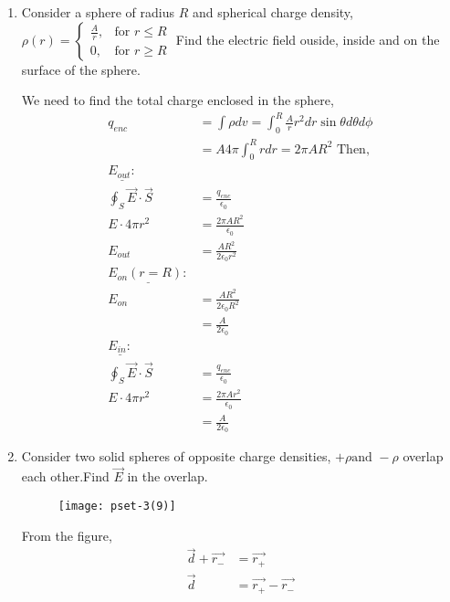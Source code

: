 \begin{enumerate}[label=\color{ocre}\textbf{\arabic*.}]
\begin{answer}
	
\end{answer}
\item Consider a sphere of radius $R$ and spherical charge density,$\rho(r)= 
\begin{cases}
\frac{A}{r},& \text{for } r\leq R\\
0,              & \text{for }  r\geq R
\end{cases}$ Find the electric field ouside, inside and on the surface of the sphere.
\begin{answer}
	We need to find the total charge enclosed in the sphere,\begin{align*}
	q_{enc}&= \int \rho dv=\int_{0}^{R}\frac{A}{r} r^{2}dr\sin \theta d\theta d \phi\\
	&= A4\pi\int_{0}^{R} rdr =2\pi AR^{2} 	\text{ Then, }\\
   \underline{ E_{out}:}\\
    \oint_{S}\vec{E}\cdot \vec{S}&=\frac{q_{enc}}{\epsilon_{0}}\\
    E\cdot 4\pi r^{2}	&=\frac{2\pi AR^{2}}{\epsilon_{0}}\\
     E_{out}	&=\frac{ AR^{2}}{2\epsilon_{0}r^{2}}\\
     \underline{ E_{on}(r=R):}\\
     E_{on}	&=\frac{ AR^{2}}{2\epsilon_{0}R^{2}}\\
     &=\frac{ A}{2\epsilon_{0}}\\
     \underline{ E_{in}:}\\
     \oint_{S}\vec{E}\cdot \vec{S}&=\frac{q_{enc}}{\epsilon_{0}}\\
      E\cdot 4\pi r^{2}	&=\frac{2\pi Ar^{2}}{\epsilon_{0}}\\
      &=\frac{ A}{2\epsilon_{0}}
     \end{align*}
\end{answer}
\item Consider two solid spheres of opposite  charge densities, $+\rho \text{and } -\rho $ overlap each other.Find $\vec{E}$ in the overlap.
\begin{figure}[H]
	\begin{center}
		\texttt{[image: pset-3(9)]}
	\end{center}
\end{figure}
\begin{answer}
	From the figure,
	\begin{align*}
	\vec{d}+\vec{r_{-}}&=\vec{r_{+}}\\
	\vec{d}&=\vec{r_{+}}-\vec{r_{-}}\\

\end{align*}
\end{answer}
\end{enumerate}
